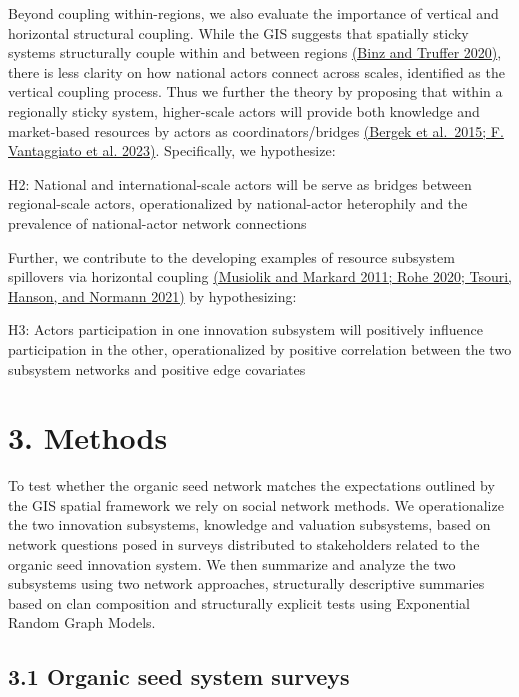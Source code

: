 \documentclass[twoside,12pt,final]{ucthesis-CA2012}
\begin{document}
\begin{ucmainmatter}
Beyond coupling within-regions, we also evaluate the importance of
vertical and horizontal structural coupling. While the GIS suggests that
spatially sticky systems structurally couple within and between regions
\href{https://www.zotero.org/google-docs/?sZQm6h}{(Binz and Truffer 2020)},
there is less clarity on how national actors connect across scales,
identified as the vertical coupling process. Thus we further the theory
by proposing that within a regionally sticky system, higher-scale actors
will provide both knowledge and market-based resources by actors as
coordinators/bridges \href{https://www.zotero.org/google-docs/?BJhuqV}{(Bergek et al.~2015; F. Vantaggiato et al.
2023)}. Specifically, we
hypothesize:

H2: National and international-scale actors will be serve as bridges
between regional-scale actors, operationalized by national-actor
heterophily and the prevalence of national-actor network connections

Further, we contribute to the developing examples of resource subsystem
spillovers via horizontal coupling \href{https://www.zotero.org/google-docs/?TppBRI}{(Musiolik and Markard 2011; Rohe
2020; Tsouri, Hanson, and Normann
2021)} by hypothesizing:

H3: Actors\textquotesingle{} participation in one innovation subsystem will positively
influence participation in the other, operationalized by positive
correlation between the two subsystem networks and positive edge
covariates

\hypertarget{methods-1}{%
\section{3. Methods}\label{methods-1}}

To test whether the organic seed network matches the expectations
outlined by the GIS spatial framework we rely on social network methods.
We operationalize the two innovation subsystems, knowledge and valuation
subsystems, based on network questions posed in surveys distributed to
stakeholders related to the organic seed innovation system. We then
summarize and analyze the two subsystems using two network approaches,
structurally descriptive summaries based on clan composition and
structurally explicit tests using Exponential Random Graph Models.

\hypertarget{organic-seed-system-surveys}{%
\subsection{3.1 Organic seed system surveys}\label{organic-seed-system-surveys}}


\end{ucmainmatter}
\end{document}
